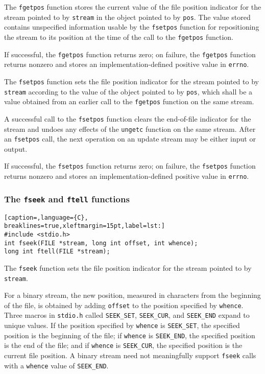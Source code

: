 The \texttt{fgetpos} function stores the current value of the file position
indicator for the stream pointed to by \texttt{stream} in the object pointed to
by \texttt{pos}. The value stored contains unspecified information usable by
the \texttt{fsetpos} function for repositioning the stream to its position at
the time of the call to the \texttt{fgetpos} function.

If successful, the \texttt{fgetpos} function returns zero; on failure, the
\texttt{fgetpos} function returns nonzero and stores an implementation-defined
positive value in \texttt{errno}.

The \texttt{fsetpos} function sets the file position indicator for the stream
pointed to by \texttt{stream} according to the value of the object pointed to
by \texttt{pos}, which shall be a value obtained from an earlier call to the
\texttt{fgetpos} function on the same stream.

A successful call to the \texttt{fsetpos} function clears the end-of-file
indicator for the stream and undoes any effects of the \texttt{ungetc} function
on the same stream. After an \texttt{fsetpos} call, the next operation on an
update stream may be either input or output.

If successful, the \texttt{fsetpos} function returns zero; on failure, the
\texttt{fsetpos} function returns nonzero and stores an implementation-defined
positive value in \texttt{errno}.

\subsubsection{The \texttt{fseek} and \texttt{ftell} functions}
\lstset{basicstyle=\scriptsize, numbers=left, captionpos=b, tabsize=4}
\begin{lstlisting}[caption=,language={C},
breaklines=true,xleftmargin=15pt,label=lst:]
#include <stdio.h>
int fseek(FILE *stream, long int offset, int whence);
long int ftell(FILE *stream);
\end{lstlisting}

The \texttt{fseek} function sets the file position indicator for the stream
pointed to by \texttt{stream}.

For a binary stream, the new position, measured in characters from the
beginning of the file, is obtained by adding \texttt{offset} to the position
specified by \texttt{whence}. Three macros in \texttt{stdio.h} called
\texttt{SEEK\_SET}, \texttt{SEEK\_CUR}, and \texttt{SEEK\_END} expand to unique
values. If the position specified by \texttt{whence} is \texttt{SEEK\_SET}, the
specified position is the beginning of the file; if \texttt{whence} is
\texttt{SEEK\_END}, the specified position is the end of the file; and if
\texttt{whence} is \texttt{SEEK\_CUR}, the specified position is the current
file position. A binary stream need not meaningfully support \texttt{fseek}
calls with a \texttt{whence} value of \texttt{SEEK\_END}.

